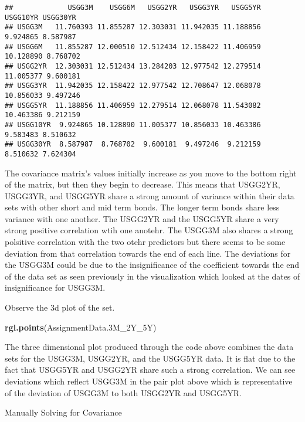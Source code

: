 \documentclass[]{article}
\newenvironment{Shaded}{\begin{snugshade}}{\end{snugshade}}
\newcommand{\KeywordTok}[1]{\textcolor[rgb]{0.13,0.29,0.53}{\textbf{#1}}}
\newcommand{\NormalTok}[1]{#1}
\begin{document}
\begin{verbatim}
##             USGG3M    USGG6M   USGG2YR   USGG3YR   USGG5YR  USGG10YR USGG30YR
## USGG3M   11.760393 11.855287 12.303031 11.942035 11.188856  9.924865 8.587987
## USGG6M   11.855287 12.000510 12.512434 12.158422 11.406959 10.128890 8.768702
## USGG2YR  12.303031 12.512434 13.284203 12.977542 12.279514 11.005377 9.600181
## USGG3YR  11.942035 12.158422 12.977542 12.708647 12.068078 10.856033 9.497246
## USGG5YR  11.188856 11.406959 12.279514 12.068078 11.543082 10.463386 9.212159
## USGG10YR  9.924865 10.128890 11.005377 10.856033 10.463386  9.583483 8.510632
## USGG30YR  8.587987  8.768702  9.600181  9.497246  9.212159  8.510632 7.624304
\end{verbatim}

The covariance matrix's values initially increase as you move to the
bottom right of the matrix, but then they begin to decrease. This means
that USGG2YR, USGG3YR, and USGG5YR share a strong amount of variance
within their data sets with other short and mid term bonds. The longer
term bonds share less variance with one another. The USGG2YR and the
USGG5YR share a very strong positive correlation wtih one anotehr. The
USGG3M also shares a strong polsitive correlation with the two otehr
predictors but there seems to be some deviation from that correlation
towards the end of each line. The deviations for the USGG3M could be due
to the insignificance of the coefficient towards the end of the data set
as seen previously in the visualization which looked at the dates of
insignificance for USGG3M.

Observe the 3d plot of the set.

\begin{Shaded}
\begin{Highlighting}[]
\KeywordTok{rgl.points}\NormalTok{(AssignmentData.3M_2Y_5Y)}
\end{Highlighting}
\end{Shaded}

The three dimensional plot produced through the code above combines the
data sets for the USGG3M, USGG2YR, and the USGG5YR data. It is flat due
to the fact that USGG5YR and USGG2YR share such a strong correlation. We
can see deviations which reflect USGG3M in the pair plot above which is
representative of the deviation of USGG3M to both USGG2YR and USGG5YR.

Manually Solving for Covariance
\end{document}

